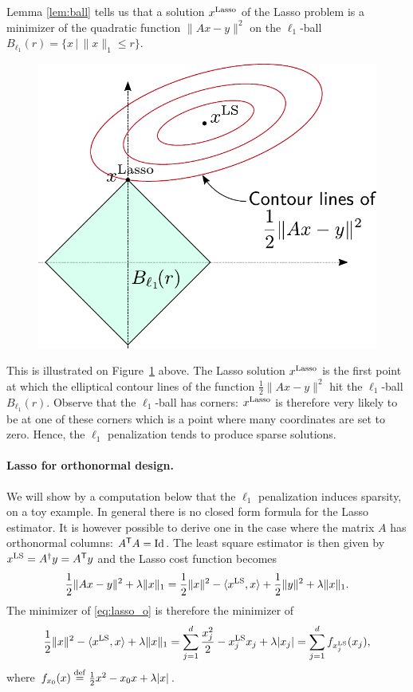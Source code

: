\documentclass[11pt,nocut]{article}
\begin{document}
Lemma \ref{lem:ball} tells us that a solution $x^{\rm Lasso}$ of the Lasso problem is a minimizer of the quadratic function $\|Ax-y\|^2$ on the $\ell_1$-ball $B_{\ell_1}(r) = \{x \, | \, \|x\|_1 \leq r\}$.

\begin{figure}[h!]
	\begin{center}
		\includegraphics[width=0.6\linewidth]{lasso.pdf}
	\end{center}
	\caption{}
	\label{fig:lasso}
\end{figure}
This is illustrated on Figure~\ref{fig:lasso} above. The Lasso solution $x^{\rm Lasso}$ is the first point at which the elliptical contour lines of the function $\frac{1}{2}\|Ax-y\|^2$ hit the $\ell_1$-ball $B_{\ell_1}(r)$. Observe that the $\ell_1$-ball has corners: $x^{\rm Lasso}$ is therefore very likely to be at one of these corners which is a point where many coordinates are set to zero. Hence, the $\ell_1$ penalization tends to produce sparse solutions.
\\

\paragraph{Lasso for orthonormal design.}
We will show by a computation below that the $\ell_1$ penalization induces sparsity, on a toy example.
In general there is no closed form formula for the Lasso estimator. It is however possible to derive one in the case where the matrix $A$ has orthonormal columns: $A^{{\sf T}} A = {{\rm Id}}$. 
The least square estimator is then given by $x^{\rm LS} = A^{\dagger}y = A^{{\sf T}} y$ and the Lasso cost function becomes
\begin{equation}\label{eq:lasso_o}
\frac{1}{2} \| Ax - y \|^2 + \lambda \|x\|_1 
= \frac{1}{2} \|x\|^2 - \langle x^{\rm LS}, x \rangle + \frac{1}{2} \|y\|^2 + \lambda \|x\|_1.
\end{equation}
The minimizer of \eqref{eq:lasso_o} is therefore the minimizer of
$$
\frac{1}{2} \|x\|^2 - \langle x^{\rm LS}, x \rangle + \lambda \|x\|_1
=
\sum_{j=1}^d \frac{x_j^2}{2} - x^{\rm LS}_j x_j + \lambda |x_j| 
=
\sum_{j=1}^d f_{x_j^{\rm LS}}(x_j),
$$
where $f_{x_0}(x) \overset{\rm def}{=} \frac{1}{2}x^2 - x_0 x + \lambda |x|$.
\end{document}
